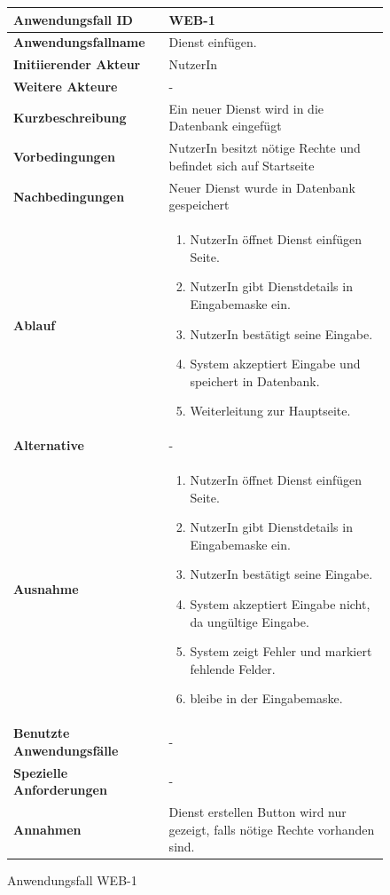 \begin{figure}[h]
	\centering
	\begin{tabularx}{\textwidth}{ X | X }
		\textbf{Anwendungsfall ID} & WEB-1 \\ \hline
		\textbf{Anwendungsfallname} & Dienst einfügen. \\ \hline
		\textbf{Initiierender Akteur} & NutzerIn \\ \hline
		\textbf{Weitere Akteure} & - \\ \hline
		\textbf{Kurzbeschreibung} & Ein neuer Dienst wird in die Datenbank eingefügt \\ \hline
		\textbf{Vorbedingungen} &   NutzerIn besitzt nötige Rechte und befindet sich auf Startseite \\ \hline
		\textbf{Nachbedingungen} & Neuer Dienst wurde in Datenbank gespeichert \\ \hline
		\textbf{Ablauf} &
		\begin{enumerate}
			\item  NutzerIn öffnet Dienst einfügen Seite.
			\item  NutzerIn gibt Dienstdetails in Eingabemaske ein.
			\item  NutzerIn bestätigt seine Eingabe.
			\item  System akzeptiert Eingabe und speichert in Datenbank.
			\item  Weiterleitung zur Hauptseite.
		\end{enumerate} \\ \hline
		\textbf{Alternative} & - \\ \hline
		\textbf{Ausnahme} &
		\begin{enumerate}
			\item  NutzerIn öffnet Dienst einfügen Seite.
			\item  NutzerIn gibt Dienstdetails in Eingabemaske ein.
			\item  NutzerIn bestätigt seine Eingabe.
			\item  System akzeptiert Eingabe nicht, da ungültige Eingabe.
			\item  System zeigt Fehler und markiert fehlende Felder.
			\item  bleibe in der Eingabemaske.
		\end{enumerate}  \\ \hline
		\textbf{Benutzte Anwendungsfälle} & - \\ \hline
		\textbf{Spezielle Anforderungen} & - \\ \hline
		\textbf{Annahmen} & Dienst erstellen Button wird nur gezeigt, falls nötige Rechte vorhanden sind.
	\end{tabularx}
	\caption{Anwendungsfall WEB-1}
	\label{fig:anwendungsfall-server-tabelle-web-1}
\end{figure}

